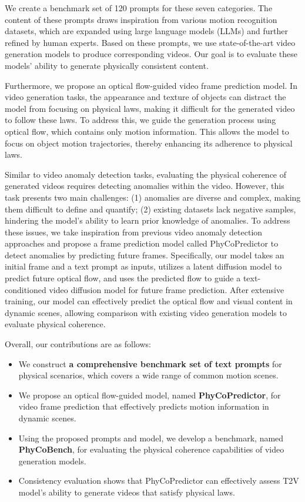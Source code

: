 We create a benchmark set of 120 prompts for these seven categories. The content of these prompts draws inspiration from various motion recognition datasets, which are expanded using large language models (LLMs) \cite{qwen2} and further refined by human experts. Based on these prompts, we use state-of-the-art video generation models to produce corresponding videos. Our goal is to evaluate these models' ability to generate physically consistent content.

Furthermore, we propose an optical flow-guided video frame prediction model. In video generation tasks, the appearance and texture of objects can distract the model from focusing on physical laws, making it difficult for the generated video to follow these laws. To address this, we guide the generation process using optical flow, which contains only motion information. This allows the model to focus on object motion trajectories, thereby enhancing its adherence to physical laws.


Similar to video anomaly detection tasks, evaluating the physical coherence of generated videos requires detecting anomalies within the video. However, this task presents two main challenges: (1) anomalies are diverse and complex, making them difficult to define and quantify; (2) existing datasets lack negative samples, hindering the model's ability to learn prior knowledge of anomalies. To address these issues, we take inspiration from previous video anomaly detection approaches \cite{hf2vad, liu2018future, nguyen2019anomaly, zaheer2020old, yang2023video} and propose a frame prediction model called PhyCoPredictor to detect anomalies by predicting future frames. Specifically, our model takes an initial frame and a text prompt as inputs, utilizes a latent diffusion model to predict future optical flow, and uses the predicted flow to guide a text-conditioned video diffusion model for future frame prediction. After extensive training, our model can effectively predict the optical flow and visual content in dynamic scenes, allowing comparison with existing video generation models to evaluate physical coherence.


Overall, our contributions are as follows:
\begin{itemize}
    \item We construct \textbf{a comprehensive benchmark set of text prompts} for physical scenarios, which covers a wide range of common motion scenes.
    \item We propose an optical flow-guided model, named \textbf{PhyCoPredictor}, for video frame prediction that effectively predicts motion information in dynamic scenes.
    \item Using the proposed prompts and model, we develop a benchmark, named \textbf{PhyCoBench}, for evaluating the physical coherence capabilities of video generation models.
    \item Consistency evaluation shows that PhyCoPredictor can effectively assess  T2V model's ability to generate videos that satisfy physical laws.


\end{itemize}